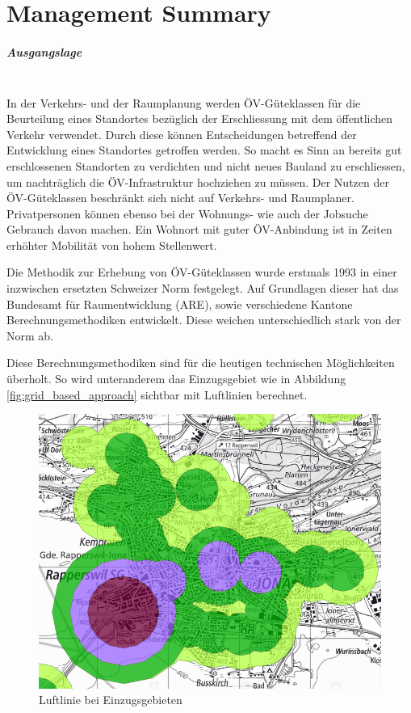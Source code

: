 
\chapter*{Management Summary}

\paragraph{Ausgangslage}~\\
In der Verkehrs- und der Raumplanung werden ÖV-Güteklassen für die Beurteilung eines Standortes bezüglich der Erschliessung mit dem öffentlichen Verkehr verwendet.
Durch diese können Entscheidungen betreffend der Entwicklung eines Standortes getroffen werden.
So macht es Sinn an bereits gut erschlossenen Standorten zu verdichten und nicht neues Bauland zu erschliessen, um nachträglich die ÖV-Infrastruktur hochziehen zu müssen.
Der Nutzen der ÖV-Güteklassen beschränkt sich nicht auf Verkehrs- und Raumplaner.
Privatpersonen können ebenso bei der Wohnungs- wie auch der Jobsuche Gebrauch davon machen.
Ein Wohnort mit guter ÖV-Anbindung ist in Zeiten erhöhter Mobilität von hohem Stellenwert.

Die Methodik zur Erhebung von ÖV-Güteklassen wurde erstmals 1993 in einer inzwischen ersetzten Schweizer Norm festgelegt.
Auf Grundlagen dieser hat das Bundesamt für Raumentwicklung (ARE), sowie verschiedene Kantone Berechnungsmethodiken entwickelt.
Diese weichen unterschiedlich stark von der Norm ab.

Diese Berechnungsmethodiken sind für die heutigen technischen Möglichkeiten überholt.
So wird unteranderem das Einzugsgebiet wie in Abbildung \ref{fig:grid_based_approach} sichtbar mit Luftlinien berechnet. 

\begin{figure}[ht]
    \centering
    \includegraphics[width=0.50\linewidth]{start/img/air_line_ARE.png}
    \caption[Luftlinie bei Einzugsgebieten]{Luftlinie bei Einzugsgebieten~\cite{berechnung_are}}
    \label{fig:air_line_ARE}
\end{figure}

